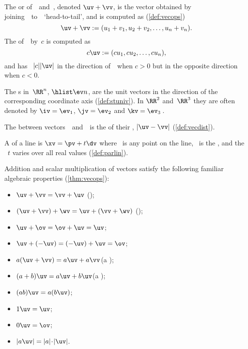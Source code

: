 \begin{itemize}
\itemme The  or  of~\uv\ and~\vv, denoted \(\uv+\vv\), is the vector obtained by joining~\vv\ to~\uv\ `head-to-tail', and is computed as (\cref{def:vecops})
\begin{equation*}
\uv+\vv:=(u_1+v_1,u_2+v_2,\ldots,u_n+v_n).
\end{equation*}
The  of~\uv\ by~\(c\) is computed as
\begin{equation*}
c\uv:=(cu_1,cu_2,\ldots,cu_n),
\end{equation*}
and has ~\(|c||\uv|\) in the direction of~\uv\ when \(c>0\) but in the opposite direction when \(c<0\).

\itemme {}%
The s in~\(\RR^n\), \(\hlist\ev n\), are the unit vectors in the direction of the corresponding coordinate axis (\cref{def:stuniv}).
In \(\RR^2\) and~\(\RR^3\) they are often denoted by \(\iv=\ev_1\), \(\jv=\ev_2\) and \(\kv=\ev_3\)\,.

\itemlo The  between vectors~\uv\ and~\vv\ is the  of their , \(|\uv-\vv|\) (\cref{def:vecdist}).

\itemlo A  of a line is \(\xv=\pv+t\dv\) where \pv~is any point on the line, \dv~is the , and the  ~\(t\) varies over all real values (\cref{def:parlin}).

\itemhi Addition and scalar multiplication of vectors satisfy the following familiar algebraic properties (\cref{thm:vecops}):
\begin{itemize}
\item \(\uv+\vv=\vv+\uv\) \quad();
\item \((\uv+\vv)+\wv=\uv+(\vv+\wv)\) \quad();
\item \(\uv+\ov=\ov+\uv=\uv\);
\item \(\uv+(-\uv)=(-\uv)+\uv=\ov\);
\item \(a(\uv+\vv)=a\uv+a\vv\)\quad(a );
\item \((a+b)\uv=a\uv+b\uv\)\quad(a );
\item \((ab)\uv=a(b\uv)\);
\item \(1\uv=\uv\);
\item \(0\uv=\ov\);
\item \(|a\uv|=|a|\cdot|\uv|\).
\end{itemize}





\end{itemize}
